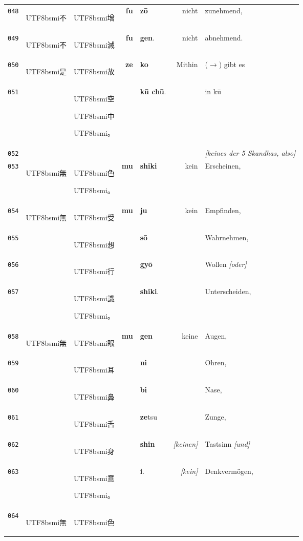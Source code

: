 \documentclass[
DIV=calc,
BCOR=5mm,
11pt,
headings=small,
oneside,
bibtotocnumbered,
english,ngerman]{scrartcl}
\newcommand{\cnbsmi}[1]{\begin{CJK}{UTF8}{bsmi}#1\end{CJK}}
\begin{document}
\begin{center}
\begin{tabular}{r|rl|rl|rl}
\hdashline
{\tiny\texttt{048}}&
  \cnbsmi{不} & \cnbsmi{增} &
  \textbf{fu} & \textbf{zō} &
  \textrm{nicht} & \textrm{zunehmend}, \\
{\tiny\texttt{049}}&
  \cnbsmi{不} & \cnbsmi{減} &
  \textbf{fu} & \textbf{gen}. &
  \textrm{nicht} & \textrm{abnehmend}. \\
\hline
{\tiny\texttt{050}}&
  \cnbsmi{是} & \cnbsmi{故} &
  \textbf{ze} & \textbf{ko} &
  \textrm{Mithin} & {\tiny ($\rightarrow$)} \textrm{gibt es}\\
{\tiny\texttt{051}}&
  ~ & \cnbsmi{空} \cnbsmi{中} \cnbsmi{。} &
  ~ & \textbf{kū chū}. &
  ~ & \textrm{in kū} \\
{\tiny\texttt{052}}&
  ~ & ~  & ~ & ~ &  ~ & \textrm{\emph{[keines der 5 Skandhas, also]}} \\
{\tiny\texttt{053}}&
  \cnbsmi{無} & \cnbsmi{色} \cnbsmi{。} &
  \textbf{mu} & \textbf{shiki} &
  \textrm{kein} & \textrm{Erscheinen}, \\
{\tiny\texttt{054}}&
  \cnbsmi{無} & \cnbsmi{受} &
  \textbf{mu} & \textbf{ju} & 
  \textrm{kein} & \textrm{Empfinden,} \\
{\tiny\texttt{055}}&
  ~ & \cnbsmi{想} &
  ~ & \textbf{sō} &
  ~ & \textrm{Wahrnehmen,} \\
{\tiny\texttt{056}}&
  ~ & \cnbsmi{行} &
  ~ & \textbf{gyō} &
  ~ & \textrm{Wollen \emph{[oder]}} \\
{\tiny\texttt{057}}&
  ~ & \cnbsmi{識} \cnbsmi{。} &
  ~ & \textbf{shiki}. & 
  ~ & \textrm{Unterscheiden}, \\
\hdashline
 {\tiny\texttt{058}}&
  \cnbsmi{無} & \cnbsmi{眼} &
  \textbf{mu} & \textbf{gen} &
  \textrm{keine} & \textrm{Augen,} \\
{\tiny\texttt{059}}&
  ~ & \cnbsmi{耳} &
  ~ & \textbf{ni} &
  ~ & \textrm{Ohren,} \\
{\tiny\texttt{060}}&
  ~ & \cnbsmi{鼻} &
  ~ & \textbf{bi} &
  ~ & \textrm{Nase,} \\
{\tiny\texttt{061}}&
  ~ & \cnbsmi{舌} &
  ~ & \textbf{ze}\tiny{tsu}&
  ~ & \textrm{Zunge,} \\
{\tiny\texttt{062}}&
  ~ & \cnbsmi{身} &
  ~ & \textbf{shin} &
  \textrm{\emph{[keinen]}} & \textrm{Tastsinn \emph{[und]}} \\
{\tiny\texttt{063}}&
  ~ & \cnbsmi{意} \cnbsmi{。} &
  ~ & \textbf{i}. & 
  \textrm{\emph{[kein]}} & \textrm{Denkvermögen}, \\
\hdashline
{\tiny\texttt{064}}&
   \cnbsmi{無} & \cnbsmi{色} &

\end{tabular}
\end{center}
\end{document}
